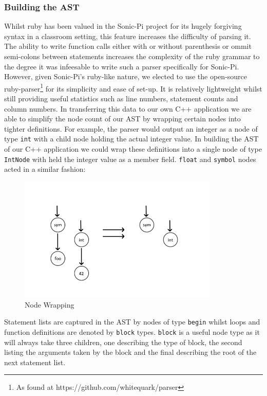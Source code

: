 \documentclass[11pt, abstracton, twoside]{scrartcl}
\begin{document}
\subsubsection{Building the AST}
Whilst ruby has been valued in the Sonic-Pi project for its hugely forgiving
syntax in a classroom setting, this feature increases the difficulty of parsing 
it. The ability to write function calls either with or without parenthesis 
or ommit semi-colons between statements increases the complexity of the ruby 
grammar to the degree it was infeesable to write such a parser specifically 
for Sonic-Pi. However, given Sonic-Pi's ruby-like nature, we elected to use 
the open-source ruby-parser\footnote{As found at https://github.com/whitequark/parser}
for its simplicity and ease of set-up. It is relatively lightweight whilst 
still providing useful statistics such as line numbers, statement counts and
column numbers. In transferring this data to our own C++ application we are 
able to simplify the node count of our AST by wrapping certain nodes into 
tighter definitions. For example, the parser would output an integer as a node 
of type \texttt{int} with a child node holding the actual integer value. In 
building the AST of our C++ application we could wrap these definitions into 
a single node of type \texttt{IntNode} with held the integer value as a 
member field. \texttt{float} and \texttt{symbol} nodes acted in a similar
fashion:

\begin{figure}[h!]
	\centering
	\includegraphics[width=0.85\textwidth]{images/SymInt.jpg}
	\caption{Node Wrapping} \label{symwrap}
\end{figure}

Statement lists are captured in the AST by nodes of type \texttt{begin} whilst
loops and function definitions are denoted by \texttt{block} types. 
\texttt{block} is a useful node type as it will always take three children, 
one describing the type of block, the second listing the arguments taken by 
the block and the final describing the root of the next statement list. 
\end{document}

